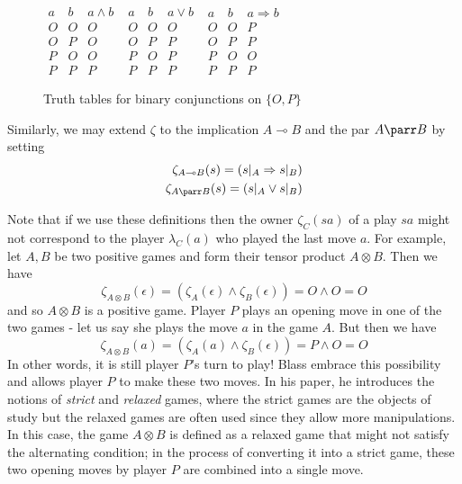 \documentclass[11pt]{article} %
\theoremstyle{plain} %
\theoremstyle{definition} %
\theoremstyle{note}
\theoremstyle{exercisestyle}
\newcommand{\tensor}{\otimes}
\renewcommand{\implies}{\multimap}
\newcommand{\OP}{\{O,P\}}
\newcommand{\emptyplay}{\epsilon}
\begin{document}
\begin{figure}[h]
  \begin{center}
    $\begin{array}{cc|c}
      a & b & a \wedge b \\
      \hline
      O & O & O \\
      O & P & O \\
      P & O & O \\
      P & P & P
    \end{array}$
    \quad
    $\begin{array}{cc|c}
      a & b & a \vee b \\
      \hline
      O & O & O \\
      O & P & P \\
      P & O & P \\
      P & P & P
    \end{array}$
    \quad
    $\begin{array}{cc|c}
      a & b & a \Rightarrow b \\
      \hline
      O & O & P \\
      O & P & P \\
      P & O & O \\
      P & P & P
    \end{array}$
    \caption{Truth tables for binary conjunctions on $\OP$}
    \label{truthtables}
  \end{center}
\end{figure}

Similarly, we may extend $\zeta$ to the implication $A\implies B$ and the par $A\parr B$ by setting
\begin{align*}
  \zeta_{A\implies B}(s)=(s\vert_A\Rightarrow s\vert_B)\\
  \zeta_{A\parr B}(s) = (s\vert_A \vee s\vert_B)
\end{align*}

Note that if we use these definitions then the owner $\zeta_C(sa)$ of a play $sa$ might not correspond to the player $\lambda_C(a)$ who played the last move $a$.  For example, let $A,B$ be two positive games and form their tensor product $A\tensor B$.  Then we have
\[
  \zeta_{A\tensor B}(\emptyplay) = (\zeta_A(\emptyplay) \wedge \zeta_B(\emptyplay)) = O \wedge O = O
  \]
and so $A\tensor B$ is a positive game.  Player $P$ plays an opening move in one of the two games - let us say she plays the move $a$ in the game $A$.  But then we have
\[
  \zeta_{A\tensor B}(a) = (\zeta_A(a) \wedge \zeta_B(\emptyplay)) = P \wedge O = O
  \]
In other words, it is still player $P$'s turn to play!  Blass embrace this possibility and allows player $P$ to make these two moves.  In his paper, he introduces the notions of \emph{strict} and \emph{relaxed} games, where the strict games are the objects of study but the relaxed games are often used since they allow more manipulations.  In this case, the game $A\tensor B$ is defined as a relaxed game that might not satisfy the alternating condition; in the process of converting it into a strict game, these two opening moves by player $P$ are combined into a single move.
\end{document}
